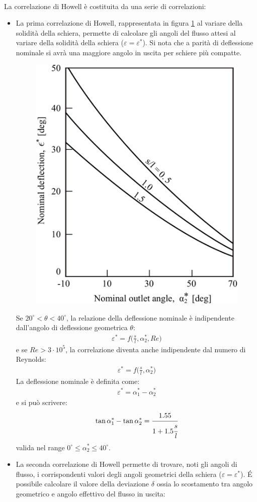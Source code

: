 \\La correlazione di Howell è costituita da una serie di correlazioni:
\begin{itemize}
	\item La prima correlazione di Howell, rappresentata in figura \ref{fig:1CorrHowell} al variare della solidità della schiera, permette di calcolare gli angoli del flusso attesi al variare della solidità della schiera ($\varepsilon = \varepsilon^*$). Si nota che a parità di deflessione nominale si avrà una maggiore angolo in uscita per schiere più compatte.
	\begin{figure}
		\centering
		\includegraphics[width=.4\textwidth]{fig/1CorrHowell.pdf}
		\caption{}
		\label{fig:1CorrHowell}
	\end{figure}
	Se $ 20^{\circ} < \theta < 40^{\circ} $, la relazione della deflessione nominale è indipendente dall'angolo di deflessione geometrica $\theta$:
	\begin{align*}
	\varepsilon^* = f \bigg( \frac{s}{l}, \alpha_2^*, Re \bigg)
	\end{align*}
	e se $Re > 3 \cdot 10^5$, la correlazione diventa anche indipendente dal numero di Reynolds:
	\begin{align*}
	\varepsilon^* = f\bigg(\frac{s}{l}, \alpha_2^*\bigg)
	\end{align*}
	La deflessione nominale è definita come:
	\begin{align*}
	\varepsilon^* = \alpha_1^* - \alpha_2^*
	\end{align*}
	e si può scrivere:
	\begin{align*}
	\tan \alpha_1^* - \tan \alpha_2^* = \cfrac{1.55}{1 + 1.5 \cfrac{s}{l}}
	\end{align*}
	valida nel range $0^\circ \leq \alpha_2^* \le 40^\circ$.
	\item La seconda correlazione di Howell permette di trovare, noti gli angoli di flusso, i corrispondenti valori degli angoli geometrici della schiera ($\varepsilon = \varepsilon^*$). \'E possibile calcolare il valore della deviazione $\delta$ ossia lo scostamento tra angolo geometrico e angolo effettivo del flusso in uscita:

\end{itemize}
